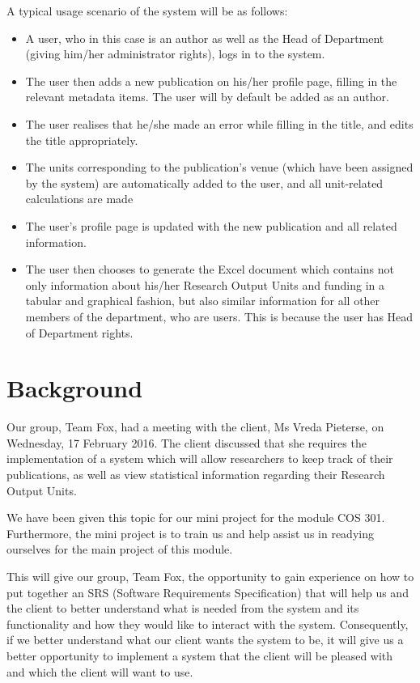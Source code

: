 \documentclass[a4paper,12pt]{article}
\begin{document}
A typical usage scenario of the system will be as follows:
\begin{itemize}

\item A user, who in this case is an author as well as the Head of Department (giving him/her administrator rights), logs in to the system.
\item The user then adds a new publication on his/her profile page, filling in the relevant metadata items. The user will by default be added as an author.
\item The user realises that he/she made an error while filling in the title, and edits the title appropriately.
\item The units corresponding to the publication's venue (which have been assigned by the system) are automatically added to the user, and all unit-related calculations are made
\item The user's profile page is updated with the new publication and all related information.
\item The user then chooses to generate the Excel document which contains not only information about his/her Research Output Units and funding in a tabular and graphical fashion, but also similar information for all other members of the department, who are users. This is because the user has Head of Department rights. 

\end{itemize}

\section{Background}

Our group, Team Fox, had a meeting with the client, Ms Vreda Pieterse, on Wednesday, 17 February 2016. The client discussed that she requires the implementation of a system which will allow researchers to keep track of their publications, as well as view statistical information regarding their Research Output Units.

We have been given this topic for our mini project for the module COS 301. Furthermore, the mini project is to train us and help assist us in readying ourselves for the main project of this module.

This will give our group, Team Fox, the opportunity to gain experience on how to put together an SRS (Software Requirements Specification) that will help us and the client to better understand what is needed from the system and its functionality and how they would like to interact with the system. Consequently, if we better understand what our client wants the system to be, it will give us a better opportunity to implement a system that the client will be pleased with and which the client will want to use.
 	
\end{document}
